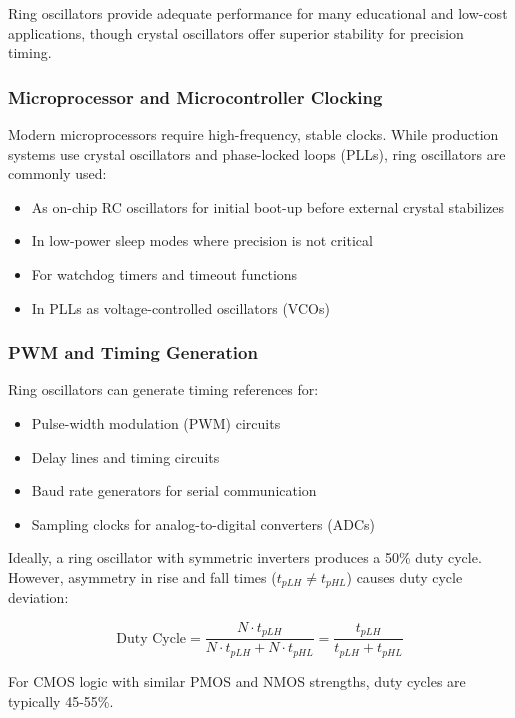 \documentclass[10pt]{article}
\begin{document}
Ring oscillators provide adequate performance for many educational and low-cost applications, though crystal oscillators offer superior stability for precision timing. 

\subsubsection{Microprocessor and Microcontroller Clocking}

Modern microprocessors require high-frequency, stable clocks. While production systems use crystal oscillators and phase-locked loops (PLLs), ring oscillators are commonly used: 

\begin{itemize}
    \item As on-chip RC oscillators for initial boot-up before external crystal stabilizes
    \item In low-power sleep modes where precision is not critical
    \item For watchdog timers and timeout functions
    \item In PLLs as voltage-controlled oscillators (VCOs)
\end{itemize}

\subsubsection{PWM and Timing Generation}

Ring oscillators can generate timing references for: 
\begin{itemize}
    \item Pulse-width modulation (PWM) circuits
    \item Delay lines and timing circuits
    \item Baud rate generators for serial communication
    \item Sampling clocks for analog-to-digital converters (ADCs)
\end{itemize}


Ideally, a ring oscillator with symmetric inverters produces a 50\% duty cycle. However, asymmetry in rise and fall times ($t_{pLH} \neq t_{pHL}$) causes duty cycle deviation:

\begin{equation}
    \text{Duty Cycle} = \frac{N \cdot t_{pLH}}{N \cdot t_{pLH} + N \cdot t_{pHL}} = \frac{t_{pLH}}{t_{pLH} + t_{pHL}}
\end{equation}

For CMOS logic with similar PMOS and NMOS strengths, duty cycles are typically 45-55\%. 
\end{document}
